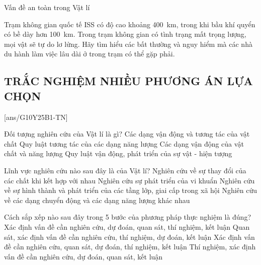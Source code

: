 \begin{dang}{Vấn đề an toàn trong Vật lí}
\end{dang}
\begin{vd}
	Trạm không gian quốc tế ISS có độ cao khoảng \SI{400}{km}, trong khi bầu khí quyển có bề dày hơn \SI{100}{km}. Trong trạm không gian có tình trạng mất trọng lượng, mọi vật sẽ tự do lơ lửng. Hãy tìm hiểu các bất thường và nguy hiểm mà các nhà du hành làm việc lâu dài ở trong trạm có thể gặp phải.
	
\end{vd}

\subsection{TRẮC NGHIỆM NHIỀU PHƯƠNG ÁN LỰA CHỌN}
\setcounter{ex}{0}
[ans/G10Y25B1-TN]
\begin{ex}
	Đối tượng nghiên cứu của Vật lí là gì?
	\choice
	{Các dạng vận động và tương tác của vật chất}
	{Quy luật tương tác của các dạng năng lượng}
	{\True Các dạng vận động của vật chất và năng lượng}
	{Quy luật vận động, phát triển của sự vật - hiện tượng}
	\loigiai{}
\end{ex}

\begin{ex}
	Lĩnh vực nghiên cứu nào sau đây là của Vật lí?
	\choice
	{Nghiên cứu về sự thay đổi của các chất khi kết hợp với nhau}
	{Nghiên cứu sự phát triển của vi khuẩn}
	{Nghiên cứu về sự hình thành và phát triển của các tầng lớp, giai cấp trong xã hội}
	{\True Nghiên cứu về các dạng chuyển động và các dạng năng lượng khác nhau}
	\loigiai{}
\end{ex}

\begin{ex}
	Cách sắp xếp nào sau đây trong 5 bước của phương pháp thực nghiệm là đúng?
	\choice
	{Xác định vấn đề cần nghiên cứu, dự đoán, quan sát, thí nghiệm, kết luận}
	{Quan sát, xác định vấn đề cần nghiên cứu, thí nghiệm, dự đoán, kết luận}
	{\True Xác định vấn đề cần nghiên cứu, quan sát, dự đoán, thí nghiệm, kết luận}
	{Thí nghiệm, xác định vấn đề cần nghiên cứu, dự đoán, quan sát, kết luận}
	\loigiai{}
\end{ex}

